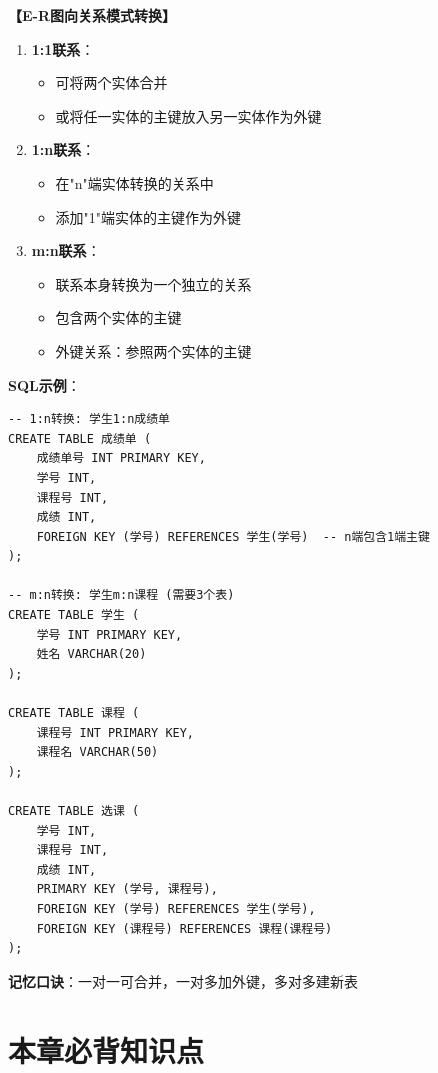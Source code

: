 \documentclass[12pt, a4paper]{article}
\newenvironment{bluebox}[1]{%
  \begin{trivlist}
  \item[\hskip\labelsep \textbf{#1}]
  \setlength{\parskip}{0.5ex}
  \setlength{\itemsep}{0.5ex}
}{%
  \end{trivlist}
  }
\begin{document}
\begin{bluebox}{转换规则}
	\textbf{【E-R图向关系模式转换】}

	\begin{enumerate}[leftmargin=*, label=\textbf{\arabic*.}]
		\item \textbf{1:1联系}：
		      \begin{itemize}[nosep]
			      \item 可将两个实体合并
			      \item 或将任一实体的主键放入另一实体作为外键
		      \end{itemize}
		\item \textbf{1:n联系}：
		      \begin{itemize}[nosep]
			      \item 在"n"端实体转换的关系中
			      \item 添加"1"端实体的主键作为外键
		      \end{itemize}
		\item \textbf{m:n联系}：
		      \begin{itemize}[nosep]
			      \item 联系本身转换为一个独立的关系
			      \item 包含两个实体的主键
			      \item 外键关系：参照两个实体的主键
		      \end{itemize}
	\end{enumerate}

	\textbf{SQL示例}：
	\begin{verbatim}
-- 1:n转换: 学生1:n成绩单
CREATE TABLE 成绩单 (
    成绩单号 INT PRIMARY KEY,
    学号 INT,
    课程号 INT,
    成绩 INT,
    FOREIGN KEY (学号) REFERENCES 学生(学号)  -- n端包含1端主键
);

-- m:n转换: 学生m:n课程 (需要3个表)
CREATE TABLE 学生 (
    学号 INT PRIMARY KEY,
    姓名 VARCHAR(20)
);

CREATE TABLE 课程 (
    课程号 INT PRIMARY KEY,
    课程名 VARCHAR(50)
);

CREATE TABLE 选课 (
    学号 INT,
    课程号 INT,
    成绩 INT,
    PRIMARY KEY (学号, 课程号),
    FOREIGN KEY (学号) REFERENCES 学生(学号),
    FOREIGN KEY (课程号) REFERENCES 课程(课程号)
);
	\end{verbatim}

	\textbf{记忆口诀}：一对一可合并，一对多加外键，多对多建新表
\end{bluebox}

\section{本章必背知识点}
\end{document}
